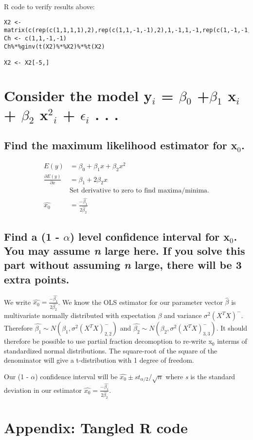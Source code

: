 \documentclass[11pt]{article}
\begin{document}
R code to verify results above:

\begin{verbatim}
X2 <- matrix(c(rep(c(1,1,1,1),2),rep(c(1,1,-1,-1),2),1,-1,1,-1,rep(c(1,-1,-1,1),2)),nrow=7,ncol=4,byrow=TRUE)
Ch <- c(1,1,-1,-1)
Ch%*%ginv(t(X2)%*%X2)%*%t(X2)

X2 <- X2[-5,]
\end{verbatim}
\section{Consider the model y$_i$ = $\beta$$_0$ +$\beta$$_1$ x$_i$ + $\beta$$_2$ x$^2$$_i$ + $\epsilon$$_i$ . . .}
\label{sec-3}
\subsection{Find the maximum likelihood estimator for x$_0$.}
\label{sec-3-1}


\begin{align*}
E(y) &= \beta_0 + \beta_1 x + \beta_2 x^2\\
\frac{\partial E(y)}{\partial x} &= \beta_1 + 2 \beta_2 x\\
&\text{Set derivative to zero to find maxima/minima.}\\
 \hat{x_0} &= \frac{-\hat{\beta_1}}{2\hat{\beta_2}}
\end{align*}
\subsection{Find a (1 - $\alpha$) level confidence interval for x$_0$. You may assume \emph{n} large here. If you solve this part without assuming \emph{n} large, there will be 3 extra points.}
\label{sec-3-2}


We write $\hat{x_0} =
\frac{-\hat{\beta_1}}{2\hat{\beta_2}}$. We know the OLS estimator for 
our parameter vector $\hat{\beta}$ is multivariate normally distributed with
expectation $\beta$ and variance $\sigma^2(X^TX)^-$. Therefore
$\hat{\beta_1}\sim N(\beta_1,\sigma^2 (X^TX)^-_{2,2})$ and
$\hat{\beta_2}\sim N(\beta_2,\sigma^2 (X^TX)^-_{3,3})$. It should
therefore be possible to use partial fraction decomoption to re-write
x$_0$ interms of standardized normal distributions. The square-root of
the square of the denominator will give a t-distribution with 1
degree of freedom. 

Our (1 - $\alpha$) confidence interval will be $\hat{x_0} \pm s
t_{\alpha/2}/\sqrt{n}$ where \emph{s} is the standard deviation in our estimator
$\hat{x_0} = \frac{-\hat{\beta_1}}{2\hat{\beta_2}}$.
\section{Appendix: Tangled R code}
\label{sec-4}



\end{document}
